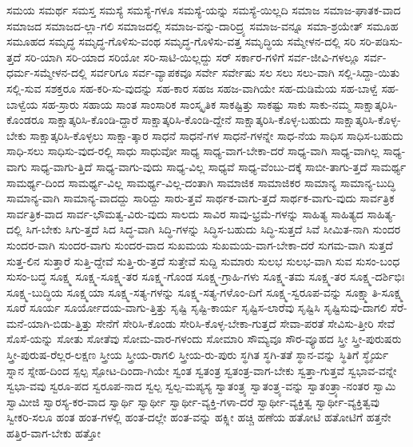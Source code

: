 {ಸಮಯ
ಸಮರ್ಥ
ಸಮಸ್ತ
ಸಮಸ್ಯೆ
ಸಮಸ್ಯೆ-ಗಳೂ
ಸಮಸ್ಯೆ-ಯನ್ನು
ಸಮಸ್ಯೆ-ಯಿಲ್ಲದಿ
ಸಮಾಜ
ಸಮಾಜ-ಘಾತಕ-ವಾದ
ಸಮಾಜದ
ಸಮಾಜದ-ಲ್ಲಾ-ಗಲಿ
ಸಮಾಜದಲ್ಲಿ
ಸಮಾಜ-ವನ್ನು-ದಾರಿದ್ರ್ಯ
ಸಮಾಜ-ವನ್ನೂ
ಸಮಾ-ಶ್ರಯೇತ್
ಸಮೂಹ
ಸಮೂಹದ
ಸಮೃದ್ಧ
ಸಮೃದ್ಧ-ಗೊಳಿಸು-ವಂಥ
ಸಮೃದ್ಧ-ಗೊಳಿಸು-ವತ್ತ
ಸಮೃದ್ಧಿಯ
ಸಮ್ಮೇಳನ-ದಲ್ಲಿ
ಸರಿ
ಸರಿ-ಪಡಿಸು-ತ್ತದೆ
ಸರಿ-ಯಾಗಿ
ಸರಿ-ಯಾದ
ಸರಿಯೋ
ಸರಿ-ಸಾಟಿ-ಯಿಲ್ಲದ್ದು
ಸರ್
ಸರ್ಕಾರ-ಗಳಿಗೆ
ಸರ್ವ-ಜೀವಿ-ಗಳಲ್ಲೂ
ಸರ್ವ-ಧರ್ಮ-ಸಮ್ಮೇಳನ-ದಲ್ಲಿ
ಸರ್ವರಿಗೂ
ಸರ್ವ-ವ್ಯಾಪಕವೂ
ಸರ್ವೇ
ಸರ್ವೇಷು
ಸಲ
ಸಲು
ಸಲು-ವಾಗಿ
ಸಲ್ಲಿ-ಸಿದ್ದಾ-ಯಿತು
ಸಲ್ಲಿ-ಸುವ
ಸಶಕ್ತರೂ
ಸಹ-ಕರಿ-ಸು-ವುದನ್ನು
ಸಹ-ಕಾರ
ಸಹಜ
ಸಹಜ-ವಾಗಿಯೇ
ಸಹ-ದುಡಿಮೆಯ
ಸಹ-ಬಾಳ್ವೆ
ಸಹ-ಬಾಳ್ವೆಯ
ಸಹ-ಸ್ರಾರು
ಸಹಾಯ
ಸಾಂತ
ಸಾಂಸಾರಿಕ
ಸಾಂಸ್ಕೃತಿಕ
ಸಾಕಷ್ಟಿತ್ತು
ಸಾಕಷ್ಟು
ಸಾಕು
ಸಾಕು-ನಮ್ಮ
ಸಾಕ್ಷಾತ್ಕರಿಸಿ-ಕೊಂಡರೂ
ಸಾಕ್ಷಾತ್ಕರಿಸಿ-ಕೊಂಡಿ-ದ್ದಾರೆ
ಸಾಕ್ಷಾತ್ಕರಿಸಿ-ಕೊಂಡಿ-ದ್ದೇನೆ
ಸಾಕ್ಷಾತ್ಕರಿಸಿ-ಕೊಳ್ಳ-ಬಹುದು
ಸಾಕ್ಷಾತ್ಕರಿಸಿ-ಕೊಳ್ಳ-ಬೇಕು
ಸಾಕ್ಷಾತ್ಕರಿಸಿ-ಕೊಳ್ಳಲು
ಸಾಕ್ಷಾ-ತ್ಕಾರ
ಸಾಧನೆ
ಸಾಧನೆ-ಗಳ
ಸಾಧನೆ-ಗಳನ್ನೇ
ಸಾಧ-ನೆಯ
ಸಾಧಿಸ
ಸಾಧಿಸ-ಬಹುದು
ಸಾಧಿ-ಸಲು
ಸಾಧಿಸು-ವುದ-ರಲ್ಲಿ
ಸಾಧು
ಸಾಧುವೋ
ಸಾಧ್ಯ
ಸಾಧ್ಯ-ವಾಗ-ಬೇಕಾ-ದರೆ
ಸಾಧ್ಯ-ವಾಗಿ
ಸಾಧ್ಯ-ವಾಗಿಲ್ಲ
ಸಾಧ್ಯ-ವಾಗು
ಸಾಧ್ಯ-ವಾಗು-ತ್ತಿದೆ
ಸಾಧ್ಯ-ವಾಗು-ವುದು
ಸಾಧ್ಯ-ವಿಲ್ಲ
ಸಾಧ್ಯವೆ
ಸಾಧ್ಯ-ವೆಂಬು-ದಕ್ಕೆ
ಸಾಬೀ-ತಾಗು-ತ್ತದೆ
ಸಾಮರ್ಥ್ಯ
ಸಾಮರ್ಥ್ಯ-ದಿಂದ
ಸಾಮರ್ಥ್ಯ-ವಿಲ್ಲ
ಸಾಮರ್ಥ್ಯ-ವಿಲ್ಲ-ದಂತಾಗಿ
ಸಾಮಾಜಿಕ
ಸಾಮಾಜಿಕರ
ಸಾಮಾನ್ಯ
ಸಾಮಾನ್ಯ-ಬುದ್ಧಿ
ಸಾಮಾನ್ಯ-ವಾಗಿ
ಸಾಮಾನ್ಯ-ವಾದದ್ದು
ಸಾರಿದ್ದು
ಸಾರು-ತ್ತವೆ
ಸಾರ್ಥಕ-ವಾಗು-ತ್ತದೆ
ಸಾರ್ಥಕ-ವಾಗು-ವುದು
ಸಾರ್ವತ್ರಿಕ
ಸಾರ್ವತ್ರಿಕ-ವಾದ
ಸಾರ್ವ-ಭೌಮತ್ವ-ವಿರು-ವುದು
ಸಾಲದು
ಸಾವಿರ
ಸಾವು-ಭ್ರಮೆ-ಗಳನ್ನು
ಸಾಹಿತ್ಯ
ಸಾಹಿತ್ಯದ
ಸಾಹಿತ್ಯ-ದಲ್ಲಿ
ಸಿಗ-ಬೇಕು
ಸಿಗು-ತ್ತದೆ
ಸಿದ
ಸಿದ್ಧ-ವಾಗಿ
ಸಿದ್ಧಿ-ಗಳನ್ನು
ಸಿದ್ಧಿಸ-ಬಹುದು
ಸಿದ್ಧಿ-ಸುತ್ತದೆ
ಸಿವೆ
ಸೀಮಿತ-ನಾಗಿ
ಸುಂದರ
ಸುಂದರ-ವಾಗಿ
ಸುಂದರ-ವಾಗು
ಸುಂದರ-ವಾದ
ಸುಖಮಯ
ಸುಖಮಯ-ವಾಗ-ಬೇಕಾ-ದರೆ
ಸುಗಮ-ವಾಗಿ
ಸುತ್ತದೆ
ಸುತ್ತ-ಲಿನ
ಸುತ್ತಾರೆ
ಸುತ್ತಿ-ದ್ದೇವೆ
ಸುತ್ತಿ-ರು-ತ್ತದೆ
ಸುತ್ತೇವೆ
ಸುದ್ದಿ
ಸುಮಾರು
ಸುಲಭ
ಸುಲಭ-ವಾಗಿ
ಸುವ
ಸುಸಂ-ಬಂಧ
ಸುಸಂ-ಬದ್ಧ
ಸೂಕ್ಷ್ಮ
ಸೂಕ್ಷ್ಮ-ಸೂಕ್ಷ್ಮ-ತರ
ಸೂಕ್ಷ್ಮ-ಗೊಂಡ
ಸೂಕ್ಷ್ಮ-ಗ್ರಾಹಿ-ಗಳು
ಸೂಕ್ಷ್ಮ-ತಮ
ಸೂಕ್ಷ್ಮ-ತರ
ಸೂಕ್ಷ್ಮ-ದರ್ಶಿಭಿಃ
ಸೂಕ್ಷ್ಮ-ಬುದ್ಧಿಯ
ಸೂಕ್ಷ್ಮಯಾ
ಸೂಕ್ಷ್ಮ-ಸತ್ಯ-ಗಳನ್ನು
ಸೂಕ್ಷ್ಮ-ಸತ್ಯ-ಗಳೊಂ-ದಿಗೆ
ಸೂಕ್ಷ್ಮ-ಸ್ವರೂಪ-ವನ್ನು
ಸೂಕ್ಷ್ಮಾತಿ-ಸೂಕ್ಷ್ಮ
ಸೂರೆ
ಸೂರ್ಯ
ಸೂರ್ಯೋದಯ-ವಾಗು-ತ್ತಿತ್ತು
ಸೃಷ್ಟಿ
ಸೃಷ್ಟಿ-ಕಾರ್ಯ
ಸೃಷ್ಟಿಸ-ಲಾರೆವು
ಸೃಷ್ಟಿಸಿ
ಸೃಷ್ಟಿಸುವು-ದಾಗಲಿ
ಸೆರೆ-ಮನೆ-ಯಾಗಿ-ಬಿಡು-ತ್ತಿತ್ತು
ಸೇನೆಗೆ
ಸೇರಿಸಿ-ಕೊಂಡು
ಸೇರಿಸಿ-ಕೊಳ್ಳ-ಬೇಕಾ-ಗುತ್ತದೆ
ಸೇವಾ-ಪರತೆ
ಸೇವಿಸು-ತ್ತೀರಿ
ಸೇವೆ
ಸೊಸೆ-ಯನ್ನು
ಸೋತು
ಸೋತೆವು
ಸೋಮ-ವಾರ-ಗಳಂದು
ಸೋಮಾರಿ
ಸೌಮ್ಯವೂ
ಸೌರ-ವ್ಯೂಹದ
ಸ್ತ್ರೀ
ಸ್ತ್ರೀ-ಪುರುಷರು
ಸ್ತ್ರೀ-ಪುರುಷ-ರೆಲ್ಲರ-ಲಕ್ಷಣ
ಸ್ತ್ರೀಯ
ಸ್ತ್ರೀಯ-ರಾಗಲಿ
ಸ್ತ್ರೀಯ-ರು-ಪುರು
ಸ್ಥಗಿತ
ಸ್ಥಗಿ-ತತೆ
ಸ್ಥಾನ-ವನ್ನು
ಸ್ಥಿತಿಗೆ
ಸ್ಥೈರ್ಯ
ಸ್ನಾನ
ಸ್ನೇಹ-ದಿಂದ
ಸ್ಪಲ್ಪ
ಸ್ಪೋಟ-ದಿಂದಾ-ಗಿಯೇ
ಸ್ವಂತ
ಸ್ವತಂತ್ರ
ಸ್ವತಂತ್ರ-ವಾಗ-ಬೇಕು
ಸ್ವತ್ತಾ-ಗುತ್ತವೆ
ಸ್ವಭಾವ-ವನ್ನೇ
ಸ್ವಭಾ-ವವು
ಸ್ವರೂ-ಪದ
ಸ್ವರೂಪ-ನಾದ
ಸ್ವಲ್ಪ
ಸ್ವಲ್ಪ-ಮಪ್ಯಸ್ಯ
ಸ್ವಾತಂತ್ರ್ಯ
ಸ್ವಾತಂತ್ರ್ಯ-ವನ್ನು
ಸ್ವಾತಂತ್ರ್ಯಾ-ನಂತರ
ಸ್ವಾಮಿ
ಸ್ವಾಮೀಜಿ
ಸ್ವಾರಸ್ಯ-ಕರ-ವಾದ
ಸ್ವಾರ್ಥಿ
ಸ್ವಾರ್ಥೀ
ಸ್ವಾರ್ಥೀ-ವ್ಯಕ್ತಿ-ಗಳಾ-ದರೆ
ಸ್ವಾರ್ಥೀ-ವ್ಯಕ್ತಿತ್ವ
ಸ್ವಾರ್ಥೀ-ವ್ಯಕ್ತಿತ್ವವು
ಸ್ವೀಕರಿ-ಸಲೂ
ಹಂತ
ಹಂತ-ಗಳಲ್ಲಿ
ಹಂತ-ದಲ್ಲೇ
ಹಂತ-ವನ್ನು
ಹಕ್ಸ್ಲೀ
ಹಚ್ಚಿ
ಹಣೆಯ
ಹತೋಟಿ
ಹತೋಟಿಗೆ
ಹತ್ತನೇ
ಹತ್ತಿರ-ವಾಗ-ಬೇಕು
ಹತ್ತೋ
}

